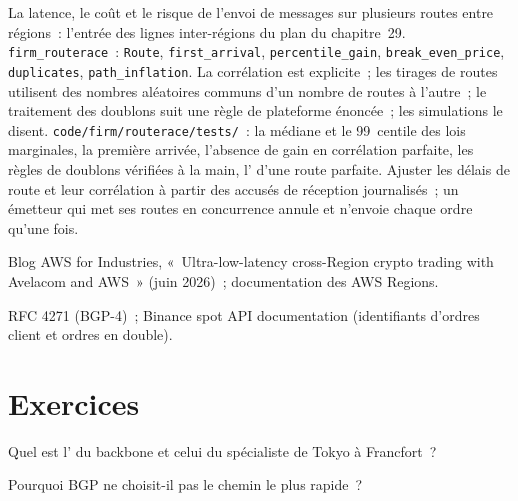 \begin{build}
 La latence, le coût et le risque de l'envoi de messages sur plusieurs routes entre régions~: l'entrée des lignes inter-régions
du plan du chapitre~29.
 \texttt{firm\_routerace}~: \texttt{Route}, \texttt{first\_arrival}, \texttt{percentile\_gain}, \texttt{break\_even\_price},
\texttt{duplicates}, \texttt{path\_inflation}.
 La corrélation est explicite~; les tirages de routes utilisent des nombres aléatoires communs d'un nombre de routes à l'autre~; le traitement des doublons suit une règle de plateforme énoncée~;
les simulations le disent.
 \texttt{code/firm/routerace/tests/}~: la médiane et le 99~centile des lois marginales, la première arrivée, l'absence de gain en
corrélation parfaite, les règles de doublons vérifiées à la main, l' d'une route parfaite.
 Ajuster les délais de route et leur corrélation à partir des accusés de réception journalisés~; un émetteur qui met ses routes en concurrence annule et n'envoie chaque ordre qu'une fois.
\end{build}

\begin{omsources}
\item Blog AWS for Industries, «~Ultra-low-latency cross-Region crypto trading with Avelacom and AWS~» (juin 2026)~; documentation des AWS Regions.
\item RFC 4271 (BGP-4)~; Binance spot API documentation (identifiants d'ordres client et ordres en double).
\end{omsources}

\section{Exercices}

\begin{exercise}[$\star$]\label{exo:nw:cross-region-crypto-networks:1}
Quel est l' du backbone et celui du spécialiste de Tokyo à Francfort~?
\end{exercise}

\begin{exercise}[$\star$]\label{exo:nw:cross-region-crypto-networks:2}
Pourquoi BGP ne choisit-il pas le chemin le plus rapide~?
\end{exercise}

